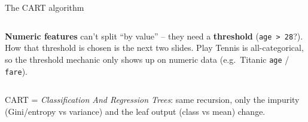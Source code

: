 \documentclass[aspectratio=169]{beamer}
\begin{document}
\begin{frame}{The CART algorithm}
  \begin{columns}[T]
    \textbf{Numeric features} can't split ``by value'' -- they need a \textbf{threshold}
    (\texttt{age > 28}?). How that threshold is chosen is the next two slides.
    \vskip 4pt
    \footnotesize Play Tennis is all-categorical, so the threshold mechanic only shows
    up on numeric data (e.g.\ Titanic \texttt{age} / \texttt{fare}).
  \end{columns}
  \vfill
  \footnotesize CART = \emph{Classification And Regression Trees}: same recursion, only
  the impurity (Gini/entropy vs variance) and the leaf output (class vs mean) change.
\end{frame}
\end{document}
